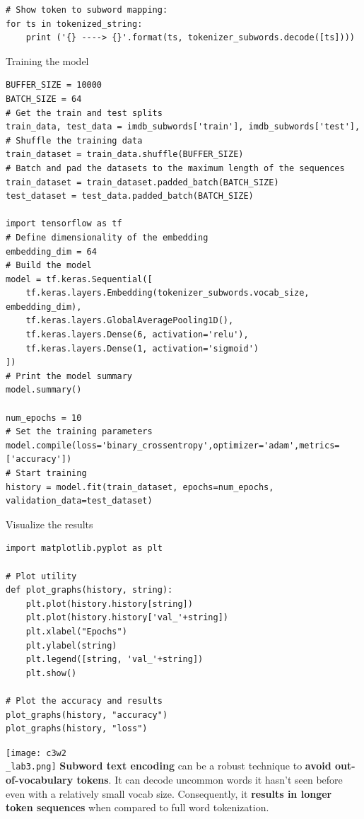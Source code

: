 \documentclass[20pt]{article}
\newcommand{\speciallink}[2]{\textbf{\textcolor{red}{\href{#1}{#2}}}}
\begin{document}
\begin{itemize}
\begin{verbatim}
# Show token to subword mapping:
for ts in tokenized_string:
	print ('{} ----> {}'.format(ts, tokenizer_subwords.decode([ts])))
		\end{verbatim}
		Training the model
		\begin{verbatim}
BUFFER_SIZE = 10000
BATCH_SIZE = 64
# Get the train and test splits
train_data, test_data = imdb_subwords['train'], imdb_subwords['test'], 
# Shuffle the training data
train_dataset = train_data.shuffle(BUFFER_SIZE)
# Batch and pad the datasets to the maximum length of the sequences
train_dataset = train_dataset.padded_batch(BATCH_SIZE)
test_dataset = test_data.padded_batch(BATCH_SIZE)

import tensorflow as tf
# Define dimensionality of the embedding
embedding_dim = 64
# Build the model
model = tf.keras.Sequential([
	tf.keras.layers.Embedding(tokenizer_subwords.vocab_size, embedding_dim),
	tf.keras.layers.GlobalAveragePooling1D(),
	tf.keras.layers.Dense(6, activation='relu'),
	tf.keras.layers.Dense(1, activation='sigmoid')
])
# Print the model summary
model.summary()

num_epochs = 10
# Set the training parameters
model.compile(loss='binary_crossentropy',optimizer='adam',metrics=['accuracy'])
# Start training
history = model.fit(train_dataset, epochs=num_epochs, validation_data=test_dataset)
		\end{verbatim}
		Visualize the results
		\begin{verbatim}
import matplotlib.pyplot as plt

# Plot utility
def plot_graphs(history, string):
	plt.plot(history.history[string])
	plt.plot(history.history['val_'+string])
	plt.xlabel("Epochs")
	plt.ylabel(string)
	plt.legend([string, 'val_'+string])
	plt.show()

# Plot the accuracy and results 
plot_graphs(history, "accuracy")
plot_graphs(history, "loss")
		\end{verbatim}
		\texttt{[image: c3w2\\\_lab3.png]}
		\textbf{Subword text encoding} can be a robust technique to \textbf{avoid out-of-vocabulary tokens}. It can decode uncommon words it hasn't seen before even with a relatively small vocab size. Consequently, it \textbf{results in longer token sequences} when compared to full word tokenization.
		
		
	\end{itemize}


\end{document}
